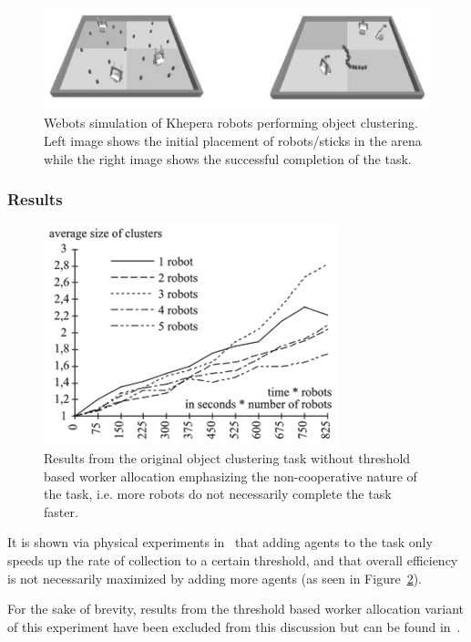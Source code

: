 \documentclass[Main.tex]{subfiles}
\begin{document}
\begin{figure}[!htb]
\centering\includegraphics[width=\textwidth]{martinoliMondadaStickCollect.png}
\caption{Webots simulation of Khepera robots performing object clustering. Left image shows the initial placement of robots/sticks in the arena while the right image shows the successful completion of the task.}\label{fig:stickforage}
\end{figure}


\subsubsection*{Results}
\begin{figure}[!htb]
\centering\includegraphics[width=.5\textwidth]{clusterRes.png}
\caption{Results from the original object clustering task without threshold based worker allocation emphasizing the non-cooperative nature of the task, i.e. more robots do not necessarily complete the task faster.}\label{fig:clusterres}
\end{figure}

It is shown via physical experiments in~\cite{Martinoli1995} that adding agents to the task only speeds up the rate of collection to a certain threshold, and that overall efficiency is not necessarily maximized by adding more agents (as seen in Figure~\ref{fig:clusterres}).

For the sake of brevity, results from the threshold based worker allocation variant of this experiment have been excluded from this discussion but can be found in~\cite{Agassounon2001, Agassounon2002a, agassounon2004}.


\end{document}
